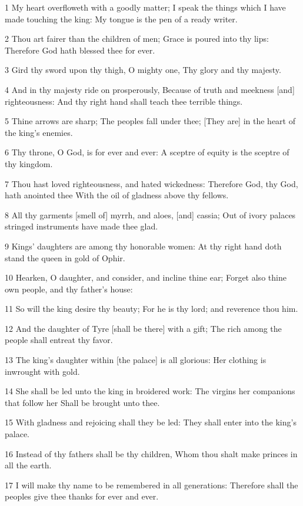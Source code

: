 \par 1 My heart overfloweth with a goodly matter; I speak the things which I have made touching the king: My tongue is the pen of a ready writer.
\par 2 Thou art fairer than the children of men; Grace is poured into thy lips: Therefore God hath blessed thee for ever.
\par 3 Gird thy sword upon thy thigh, O mighty one, Thy glory and thy majesty.
\par 4 And in thy majesty ride on prosperously, Because of truth and meekness [and] righteousness: And thy right hand shall teach thee terrible things.
\par 5 Thine arrows are sharp; The peoples fall under thee; [They are] in the heart of the king's enemies.
\par 6 Thy throne, O God, is for ever and ever: A sceptre of equity is the sceptre of thy kingdom.
\par 7 Thou hast loved righteousness, and hated wickedness: Therefore God, thy God, hath anointed thee With the oil of gladness above thy fellows.
\par 8 All thy garments [smell of] myrrh, and aloes, [and] cassia; Out of ivory palaces stringed instruments have made thee glad.
\par 9 Kings' daughters are among thy honorable women: At thy right hand doth stand the queen in gold of Ophir.
\par 10 Hearken, O daughter, and consider, and incline thine ear; Forget also thine own people, and thy father's house:
\par 11 So will the king desire thy beauty; For he is thy lord; and reverence thou him.
\par 12 And the daughter of Tyre [shall be there] with a gift; The rich among the people shall entreat thy favor.
\par 13 The king's daughter within [the palace] is all glorious: Her clothing is inwrought with gold.
\par 14 She shall be led unto the king in broidered work: The virgins her companions that follow her Shall be brought unto thee.
\par 15 With gladness and rejoicing shall they be led: They shall enter into the king's palace.
\par 16 Instead of thy fathers shall be thy children, Whom thou shalt make princes in all the earth.
\par 17 I will make thy name to be remembered in all generations: Therefore shall the peoples give thee thanks for ever and ever.

